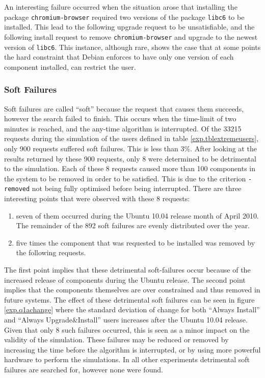 An interesting failure occurred when the situation arose that installing the package \texttt{chromium-browser} required two versions of the package \texttt{libc6} to be installed. 
This lead to the following upgrade request to be unsatisfiable, and the following install request to remove \texttt{chromium-browser} and upgrade to the newest version of \texttt{libc6}.
This instance, although rare, shows the case that at some points the hard constraint that Debian enforces to have only one version of each component installed,
can restrict the user.

\subsubsection{Soft Failures}
Soft failures are called ``soft'' because the request that causes them succeeds, however the search failed to finish.
This occurs when the time-limit of two minutes is reached, and the any-time algorithm is interrupted.
Of the 33215 requests during the simulation of the users defined in table \ref{exp.tblextremeusers},
only 900 requests suffered soft failures.
This is less than 3\%.
After looking at the results returned by these 900 requests,
only 8 were determined to be detrimental to the simulation.
Each of these 8 requests caused more than 100 components in the system to be removed in order to be satisfied.
This is due to the criterion \texttt{-removed} not being fully optimised before being interrupted.
There are three interesting points that were observed with these 8 requests:
\begin{enumerate}
  \item seven of them occurred during the Ubuntu 10.04 release month of April 2010. The remainder of the 892 soft failures are evenly distributed over the year.
  \item five times the component that was requested to be installed was removed by the following requests.
\end{enumerate}
The first point implies that these detrimental soft-failures occur because of the increased release of components during the Ubuntu release.
The second point implies that the components themselves are over constrained and thus removed in future systems.
The effect of these detrimental soft failures can be seen in figure \ref{exp.q1achange} 
where the standard deviation of change for both ``Always Install'' and ``Always Upgrade\&Install'' users increases after the Ubuntu 10.04 release.
Given that only 8 such failures occurred, this is seen as a minor impact on the validity of the simulation.
These failures may be reduced or removed by increasing the time before the algorithm is interrupted, or by using more powerful hardware to perform the simulations.
In all other experiments detrimental soft failures are searched for, however none were found.


